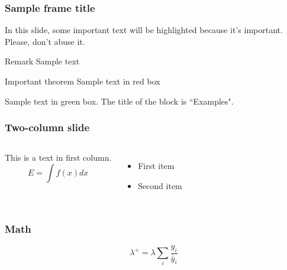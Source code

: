 \documentclass[8pt,aspectratio=169,xcolor=dvipsnames]{beamer} %
\begin{document}
\begin{frame}
\frametitle{Sample frame title}

In this slide, some important text will be
\alert{highlighted} because it's important.
Please, don't abuse it.

\begin{block}{Remark}
Sample text
\end{block}

\begin{alertblock}{Important theorem}
Sample text in red box
\end{alertblock}

\begin{examples}
Sample text in green box. The title of the block is ``Examples".
\end{examples}
\end{frame}


\begin{frame}
\frametitle{Two-column slide}

\begin{columns}

This is a text in first column.
$$E=\int f(x) dx$$
\begin{itemize}
\item First item
\item Second item
\end{itemize}


\begin{center}
\resizebox{0.95\columnwidth}{!} {%
  
}
\end{center}

\end{columns}
\end{frame}

\begin{frame}
\frametitle{Math}

\begin{equation}
    \lambda^+ = \lambda \sum_i \frac{y_i}{\bar{y}_i}
\end{equation}

\end{frame}
\end{document}
